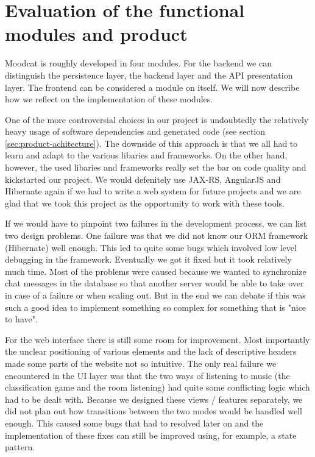 
\chapter{Evaluation of the functional modules and product}

Moodcat is roughly developed in four modules.
For the backend we can distinguish the persistence layer, the backend layer and the API presentation layer.
The frontend can be considered a module on itself.
We will now describe how we reflect on the implementation of these modules.

One of the more controversial choices in our project is undoubtedly the relatively heavy usage of software dependencies and generated code (see section \ref{sec:product-achitecture}).
The downside of this approach is that we all had to learn and adapt to the various libaries and frameworks.
On the other hand, however, the used libaries and frameworks really set the bar on code quality and kickstarted our project.
We would defenitely use JAX-RS, AngularJS and Hibernate again if we had to write a web system for future projects and we are glad that we took this project as the opportunity to work with these tools.

If we would have to pinpoint two failures in the development process, we can list two design problems.
One failure was that we did not know our ORM framework (Hibernate) well enough.
This led to quite some bugs which involved low level debugging in the framework.
Eventually we got it fixed but it took relatively much time.
Most of the problems were caused because we wanted to synchronize chat messages in the database so that another server would be able to take over in case of a failure or when scaling out.
But in the end we can debate if this was such a good idea to implement something so complex for something that is "nice to have".

For the web interface there is still some room for improvement.
Most importantly the unclear positioning of various elements and the lack of descriptive headers made some parts of the website not so intuitive.
The only real failure we encountered in the UI layer was that the two ways of listening to music (the classification game and the room listening) had quite some conflicting logic which had to be dealt with.
Because we designed these views / features separately, we did not plan out how transitions between the two modes would be handled well enough.
This caused some bugs that had to resolved later on and the implementation of these fixes can still be improved using, for example, a state pattern.

